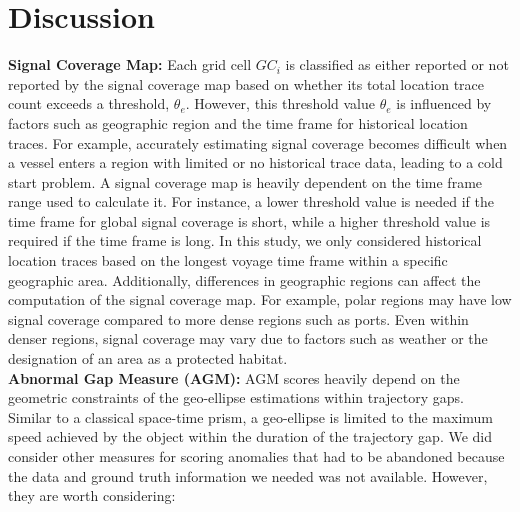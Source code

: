 \documentclass[acmsmall]{acmart}
\begin{document}
\section{Discussion}
\label{section:Discussion}
\textbf{Signal Coverage Map:} Each grid cell $GC_{i}$ is classified as either reported or not reported by the signal coverage map based on whether its total location trace count exceeds a threshold, $\theta_e$. However, this threshold value $\theta_e$ is influenced by factors such as geographic region and the time frame for historical location traces. For example, accurately estimating signal coverage becomes difficult when a vessel enters a region with limited or no historical trace data, leading to a cold start problem. A signal coverage map is heavily dependent on the time frame range used to calculate it. For instance, a lower threshold value is needed if the time frame for global signal coverage is short, while a higher threshold value is required if the time frame is long. In this study, we only considered historical location traces based on the longest voyage time frame within a specific geographic area. Additionally, differences in geographic regions can affect the computation of the signal coverage map. For example, polar regions may have low signal coverage compared to more dense regions such as ports. Even within denser regions, signal coverage may vary due to factors such as weather or the designation of an area as a protected habitat.\\

\textbf{Abnormal Gap Measure (AGM):} AGM scores heavily depend on the geometric constraints of the geo-ellipse estimations within trajectory gaps. Similar to a classical space-time prism, a geo-ellipse is limited to the maximum speed achieved by the object within the duration of the trajectory gap. We did consider other measures for scoring anomalies that had to be abandoned because the data and ground truth information we needed was not available. However, they are worth considering:
\end{document}
